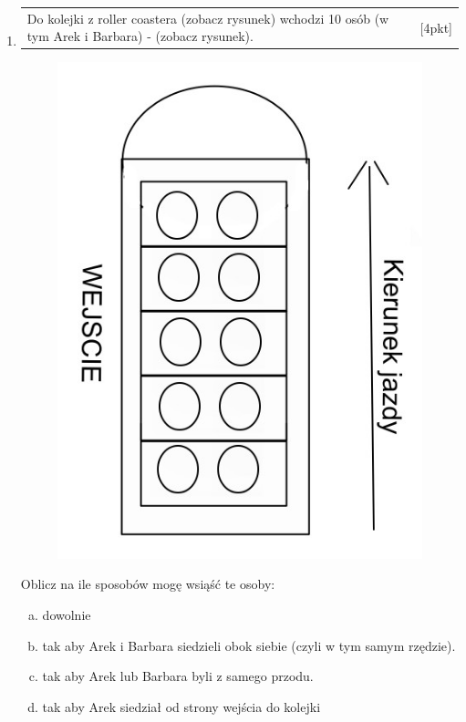 \documentclass[12pt,a4paper]{article}
\begin{document}
\begin{enumerate}[1.]
		\item  \begin{tabular}{p{13cm} r}
			Do kolejki z roller coastera (zobacz rysunek) wchodzi 10 osób (w tym Arek i Barbara) - (zobacz rysunek). &[4pkt]\\ 
		\end{tabular}
		
		\begin{figure}[h]
			\centering
			\includegraphics[scale=0.4]{rpt2.jpeg}
		\end{figure}
		Oblicz na ile sposobów mogę wsiąść te osoby:
		\begin{enumerate}[a)]
			\item dowolnie
			\item tak aby Arek i Barbara siedzieli obok siebie (czyli w tym samym rzędzie).
			\item tak aby Arek lub Barbara byli z samego przodu.
			\item tak aby Arek siedział od strony wejścia do kolejki
		\end{enumerate}
	

		
		\newpage
		

\end{enumerate}
\end{document}
